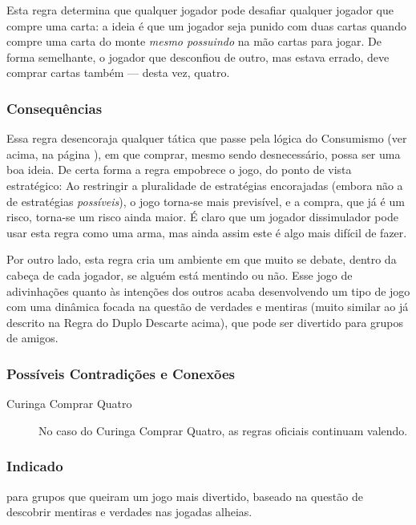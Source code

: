 Esta regra determina que qualquer jogador pode desafiar qualquer jogador que compre uma carta: a ideia é que um jogador seja punido com duas cartas quando compre uma carta do monte \emph{mesmo possuindo} na mão cartas para jogar. De forma semelhante, o jogador que desconfiou de outro, mas estava errado, deve comprar cartas também --- desta vez, quatro.

\subsubsection{Consequências}

Essa regra desencoraja qualquer tática que passe pela lógica do Consumismo (ver acima, na página \pageref{consumismo}), em que comprar, mesmo sendo desnecessário, possa ser uma boa ideia. De certa forma a regra empobrece o jogo, do ponto de vista estratégico: Ao restringir a pluralidade de estratégias encorajadas (embora não a de estratégias \emph{possíveis}), o jogo torna-se mais previsível, e a compra, que já é um risco, torna-se um risco ainda maior. É claro que um jogador dissimulador pode usar esta regra como uma arma, mas ainda assim este é algo mais difícil de fazer.

Por outro lado, esta regra cria um ambiente em que muito se debate, dentro da cabeça de cada jogador, se alguém está mentindo ou não. Esse jogo de adivinhações quanto às intenções dos outros acaba desenvolvendo um tipo de jogo com uma dinâmica focada na questão de verdades e mentiras (muito similar ao já descrito na Regra do Duplo Descarte acima), que pode ser divertido para grupos de amigos.

\subsubsection{Possíveis Contradições e Conexões}

\begin{description}
\item[Curinga Comprar Quatro]{No caso do Curinga Comprar Quatro, as regras oficiais continuam valendo.}
\end{description}

\subsubsection{Indicado} 

para grupos que queiram um jogo mais divertido, baseado na questão de descobrir mentiras e verdades nas jogadas alheias.

